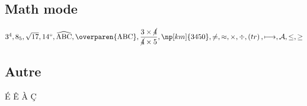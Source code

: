 \documentclass[fiche]{classe-tex3R}
\begin{document}
\sautligne
\begin{scratch}
    {
            {
            }
            {
            }
    }
\end{scratch}

\sautligne


\sautligne


\subsection{Math mode}
$3^{4}, 8 _{5}, \sqrt{17}, 14^\circ, \widehat{\mathrm{ABC}}, \overparen{\mathrm{ABC}}, \dfrac{3\times \cancel{4}}{\cancel{4} \times 5}, \np[km]{3450}, \ne, \approx, \times, \div, \left(tr\right),\longmapsto,\mathcal{A}, \leq,\geq$

\subsection{Autre}
\og É Ê À Ç \fg
\end{document}
